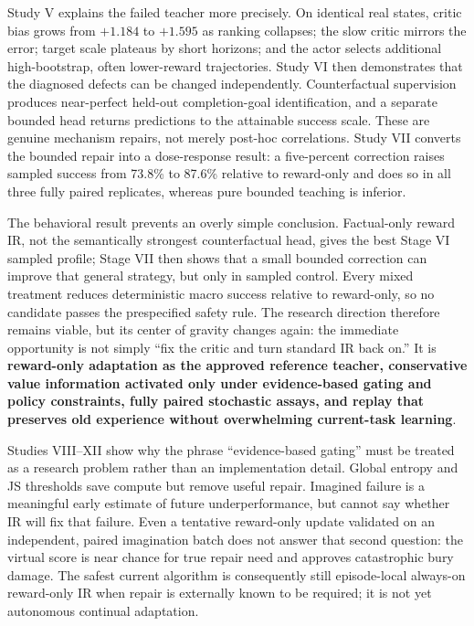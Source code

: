 \documentclass[10pt]{article}
\newcommand{\pct}[1]{#1\%}
\begin{document}
Study V explains the failed teacher more precisely. On identical real states, critic bias grows from $+1.184$ to $+1.595$ as ranking collapses; the slow critic mirrors the error; target scale plateaus by short horizons; and the actor selects additional high-bootstrap, often lower-reward trajectories. Study VI then demonstrates that the diagnosed defects can be changed independently. Counterfactual supervision produces near-perfect held-out completion-goal identification, and a separate bounded head returns predictions to the attainable success scale. These are genuine mechanism repairs, not merely post-hoc correlations. Study VII converts the bounded repair into a dose-response result: a five-percent correction raises sampled success from \pct{73.8} to \pct{87.6} relative to reward-only and does so in all three fully paired replicates, whereas pure bounded teaching is inferior.

The behavioral result prevents an overly simple conclusion. Factual-only reward IR, not the semantically strongest counterfactual head, gives the best Stage VI sampled profile; Stage VII then shows that a small bounded correction can improve that general strategy, but only in sampled control. Every mixed treatment reduces deterministic macro success relative to reward-only, so no candidate passes the prespecified safety rule. The research direction therefore remains viable, but its center of gravity changes again: the immediate opportunity is not simply ``fix the critic and turn standard IR back on.'' It is \textbf{reward-only adaptation as the approved reference teacher, conservative value information activated only under evidence-based gating and policy constraints, fully paired stochastic assays, and replay that preserves old experience without overwhelming current-task learning}.

Studies VIII--XII show why the phrase ``evidence-based gating'' must be treated
as a research problem rather than an implementation detail. Global entropy and
JS thresholds save compute but remove useful repair. Imagined failure is a
meaningful early estimate of future underperformance, but cannot say whether
IR will fix that failure. Even a tentative reward-only update validated on an
independent, paired imagination batch does not answer that second question:
the virtual score is near chance for true repair need and approves catastrophic
bury damage. The safest current algorithm is consequently still episode-local
always-on reward-only IR when repair is externally known to be required; it is
not yet autonomous continual adaptation.
\end{document}
